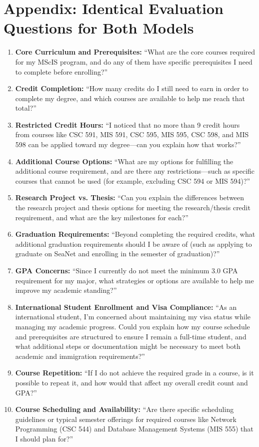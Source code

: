 \documentclass[12pt,oneside,openany]{report}
\begin{document}
\chapter{Appendix: Identical Evaluation Questions for Both Models}

\begin{enumerate}[leftmargin=*, label=\textbf{\arabic*.}]
    \item \textbf{Core Curriculum and Prerequisites:} “What are the core courses required for my MScIS program, and do any of them have specific prerequisites I need to complete before enrolling?”
    \item \textbf{Credit Completion:} “How many credits do I still need to earn in order to complete my degree, and which courses are available to help me reach that total?”
    \item \textbf{Restricted Credit Hours:} “I noticed that no more than 9 credit hours from courses like CSC 591, MIS 591, CSC 595, MIS 595, CSC 598, and MIS 598 can be applied toward my degree—can you explain how that works?”
    \item \textbf{Additional Course Options:} “What are my options for fulfilling the additional course requirement, and are there any restrictions—such as specific courses that cannot be used (for example, excluding CSC 594 or MIS 594)?”
    \item \textbf{Research Project vs. Thesis:} “Can you explain the differences between the research project and thesis options for meeting the research/thesis credit requirement, and what are the key milestones for each?”
    \item \textbf{Graduation Requirements:} “Beyond completing the required credits, what additional graduation requirements should I be aware of (such as applying to graduate on SeaNet and enrolling in the semester of graduation)?”
    \item \textbf{GPA Concerns:} “Since I currently do not meet the minimum 3.0 GPA requirement for my major, what strategies or options are available to help me improve my academic standing?”
    \item \textbf{International Student Enrollment and Visa Compliance:} “As an international student, I’m concerned about maintaining my visa status while managing my academic progress. Could you explain how my course schedule and prerequisites are structured to ensure I remain a full-time student, and what additional steps or documentation might be necessary to meet both academic and immigration requirements?”
    \item \textbf{Course Repetition:} “If I do not achieve the required grade in a course, is it possible to repeat it, and how would that affect my overall credit count and GPA?”
    \item \textbf{Course Scheduling and Availability:} “Are there specific scheduling guidelines or typical semester offerings for required courses like Network Programming (CSC 544) and Database Management Systems (MIS 555) that I should plan for?”
\end{enumerate}
\end{document}
